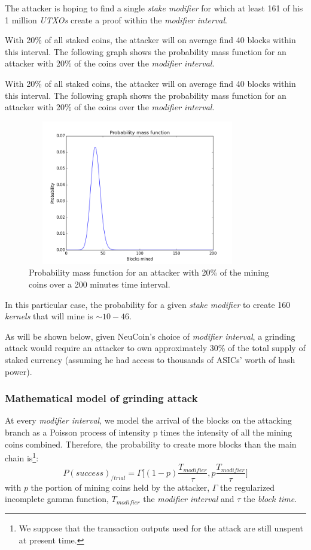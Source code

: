 \documentclass[a4paper,11pt]{article}
\begin{document}
The attacker is hoping to find a single \textit{stake modifier} for which at least 161 of his 1 million \textit{UTXOs} create a proof within the \textit{modifier interval}.

With 20\% of all staked coins, the attacker will on average find 40 blocks within this interval. The following graph shows the probability mass function for an attacker with 20\% of the coins over the \textit{modifier interval}.

With 20\% of all staked coins, the attacker will on average find 40 blocks within this interval. The following graph shows the probability mass function for an attacker with 20\% of the coins over the \textit{modifier interval}.


\begin{figure}[H]
\centering
\includegraphics[width=96mm,height=63mm]{06_gaussian_20perc.png}
\caption{Probability mass function for an attacker with 20\% of the mining coins over a 200 minutes time interval.}
\end{figure}

In this particular case, the probability for a given \textit{stake modifier} to create 160 \textit{kernels} that will mine is $\sim10-{46}$. 

As will be shown below, given NeuCoin's choice of \textit{modifier interval}, a grinding attack would require an attacker to own approximately 30\% of the total supply of staked currency (assuming he had access to thousands of ASICs' worth of hash power).

\subsubsection*{Mathematical model of grinding attack}

At every \textit{modifier interval}, we model the arrival of the blocks on the attacking branch as a Poisson process of intensity p times the intensity of all the mining coins combined. Therefore, the probability to create more blocks than the main chain is\footnote{We suppose that the transaction outputs used for the attack are still unspent at present time.}:
$$P(success)_{/trial}=\Gamma\Big[(1-p)\frac{T_{modifier}}{\tau},p\frac{T_{modifier}}{\tau}\Big]$$
with $p$ the portion of mining coins held by the attacker, $\Gamma$ the regularized incomplete gamma function, $T_{modifier}$ the \textit{modifier interval} and $\tau$ the \textit{block time}.
\end{document}
